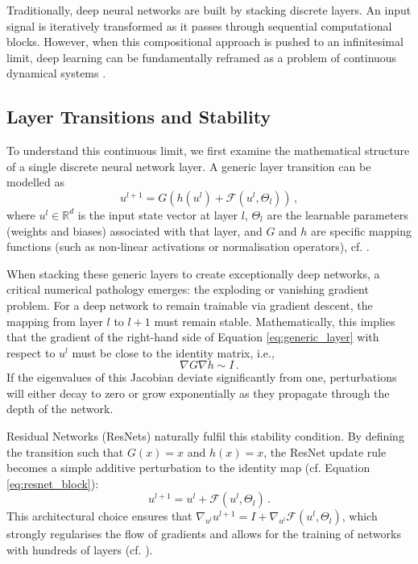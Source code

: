 Traditionally, deep neural networks are built by stacking discrete layers. An input signal is iteratively transformed as it passes through sequential computational blocks. However, when this compositional approach is pushed to an infinitesimal limit, deep learning can be fundamentally reframed as a problem of continuous dynamical systems \cite{e2017proposal,haber2017stable}.

\subsection{Layer Transitions and Stability}

To understand this continuous limit, we first examine the mathematical structure of a single discrete neural network layer. A generic layer transition can be modelled as
\begin{equation}
    u^{l+1} = G\left(h(u^l) + \mathcal{F}(u^l, \Theta_l)\right) \, ,
    \label{eq:generic_layer}
\end{equation}
where $u^l \in \mathbb{R}^d$ is the input state vector at layer $l$, $\Theta_l$ are the learnable parameters (weights and biases) associated with that layer, and $G$ and $h$ are specific mapping functions (such as non-linear activations or normalisation operators), cf. \cite{haber2017stable}. 

When stacking these generic layers to create exceptionally deep networks, a critical numerical pathology emerges: the exploding or vanishing gradient problem. For a deep network to remain trainable via gradient descent, the mapping from layer $l$ to $l+1$ must remain stable. Mathematically, this implies that the gradient of the right-hand side of Equation \eqref{eq:generic_layer} with respect to $u^l$ must be close to the identity matrix, i.e.,
\begin{equation*}
    \nabla G \nabla h \sim I \, .
\end{equation*}
If the eigenvalues of this Jacobian deviate significantly from one, perturbations will either decay to zero or grow exponentially as they propagate through the depth of the network.

Residual Networks (ResNets) naturally fulfil this stability condition. By defining the transition such that $G(x) = x$ and $h(x) = x$, the ResNet update rule becomes a simple additive perturbation to the identity map (cf. Equation \eqref{eq:resnet_block}):
\begin{equation}
    u^{l+1} = u^l + \mathcal{F}(u^l, \Theta_l) \, .
    \label{eq:resnet_discrete}
\end{equation}
This architectural choice ensures that $\nabla_{u^l} u^{l+1} = I + \nabla_{u^l} \mathcal{F}(u^l, \Theta_l)$, which strongly regularises the flow of gradients and allows for the training of networks with hundreds of layers (cf. \cite{haber2017stable, e2017proposal}).

